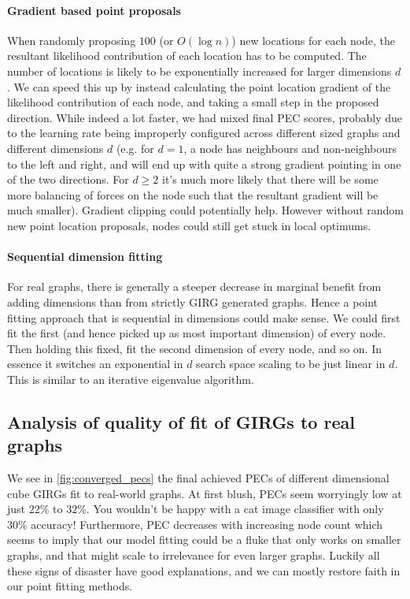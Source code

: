 \paragraph{Gradient based point proposals}
When randomly proposing $100$ (or $O(\log n)$) new locations for each node, the resultant likelihood contribution of each location has to be computed. The number of locations is likely to be exponentially increased for larger dimensions $d$. We can speed this up by instead calculating the point location gradient of the likelihood contribution of each node, and taking a small step in the proposed direction. While indeed a lot faster, we had mixed final PEC scores, probably due to the learning rate being improperly configured across different sized graphs and different dimensions $d$ (e.g. for $d=1$, a node has neighbours and non-neighbours to the left and right, and will end up with quite a strong gradient pointing in one of the two directions. For $d \geq 2$ it's much more likely that there will be some more balancing of forces on the node such that the resultant gradient will be much smaller). Gradient clipping could potentially help. However without random new point location proposals, nodes could still get stuck in local optimums.

\paragraph{Sequential dimension fitting}
For real graphs, there is generally a steeper decrease in marginal benefit from adding dimensions than from strictly GIRG generated graphs. Hence a point fitting approach that is sequential in dimensions could make sense. We could first fit the first (and hence picked up as most important dimension) of every node. Then holding this fixed, fit the second dimension of every node, and so on. In essence it switches an exponential in $d$ search space scaling to be just linear in $d$. This is similar to an iterative eigenvalue algorithm.


\subsection{Analysis of quality of fit of GIRGs to real graphs}
We see in \cref{fig:converged_pecs} the final achieved PECs of different dimensional cube GIRGs fit to real-world graphs. At first blush, PECs seem worryingly low at just $22\%$ to $32\%$. You wouldn't be happy with a cat image classifier with only $30\%$ accuracy!
Furthermore, PEC decreases with increasing node count which seems to imply that our model fitting could be a fluke that only works on smaller graphs, and that might scale to irrelevance for even larger graphs.
Luckily all these signs of disaster have good explanations, and we can mostly restore faith in our point fitting methods.

